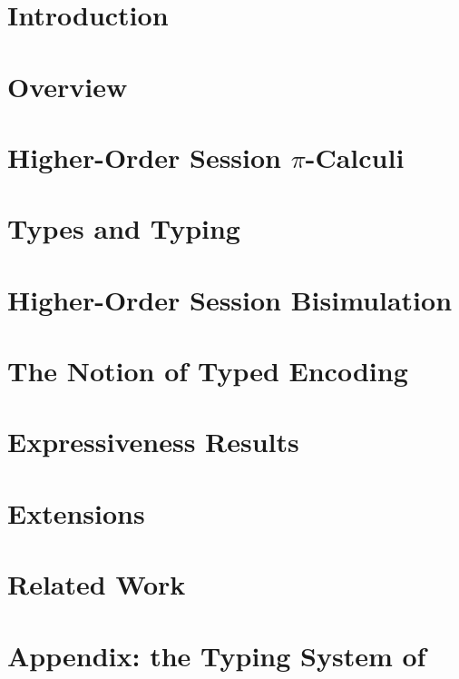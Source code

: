 \documentclass[preprint,nocopyrightspace]{sigplanconf}
\begin{document}
%

\section{Introduction}
\label{sec:intro}


\section{Overview} %
%

\section{Higher-Order Session $\pi$-Calculi}
\label{sec:calculus}


\section{Types and Typing}
%

\section{Higher-Order Session Bisimulation}
%

\section{The Notion of Typed Encoding}
\label{s:expr}


\section{Expressiveness Results}
\label{sec:positive}




\section{Extensions}
\label{sec:extension}


\section{Related Work}
\label{sec:relwork}




%

{}

\newpage
\appendix 
\section{Appendix: the Typing System of \HOp}
\label{app:types}



%
%


\end{document}
